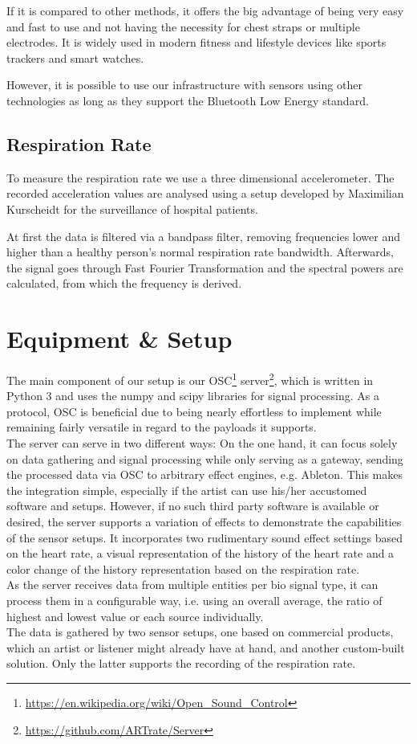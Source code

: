 \documentclass{sigchi-ext}
\begin{document}
If it is compared to other methods, it offers the big advantage of being very easy and fast
to use and not having the necessity for chest straps or multiple electrodes. It is widely used
in modern fitness and lifestyle devices like sports trackers and smart watches.

However, it is possible to use our infrastructure with sensors using other technologies
as long as they support the Bluetooth Low Energy standard.

\subsection{Respiration Rate}

To measure the respiration rate we use a three dimensional accelerometer. The recorded
acceleration values are analysed using a setup developed by Maximilian Kurscheidt for
the surveillance of hospital patients\cite{kurscheidt2016open}.

At first the data is filtered via a bandpass filter, removing frequencies lower and higher
than a healthy person's normal respiration rate bandwidth. Afterwards, the signal goes through
Fast Fourier Transformation and the spectral powers are calculated, from which the frequency is
derived. %

\section{Equipment \& Setup}

The main component of our setup is our OSC\footnote{\url{https://en.wikipedia.org/wiki/Open_Sound_Control}}
server\footnote{\url{https://github.com/ARTrate/Server}}, which is written in Python 3 and uses the numpy and
scipy libraries for signal processing. As a protocol, OSC is beneficial due to being nearly effortless
to implement while remaining fairly versatile in regard to the payloads it supports. \\
The server can serve in two different ways: On the one hand, it can focus solely on data gathering and signal 
processing while only serving as a gateway, sending the processed data via OSC to arbitrary effect
engines, e.g. Ableton. This makes the integration simple, especially if the artist can use his/her accustomed software and setups. However, if no such third party software is available or desired, the server supports a variation of effects to demonstrate the capabilities of the sensor setups. It incorporates two rudimentary
sound effect settings based on the heart rate, a visual representation of the history of the heart rate
and a color change of the history representation based on the respiration rate.\\
As the server receives data from multiple entities per bio signal type, it can process them in a 
configurable way, i.e. using an overall average, the ratio of highest and lowest value or each source
individually. \\
The data is gathered by two sensor setups, one based on commercial products, which an artist or
listener might already have at hand, and another custom-built solution. Only the latter supports
the recording of the respiration rate.
\end{document}
